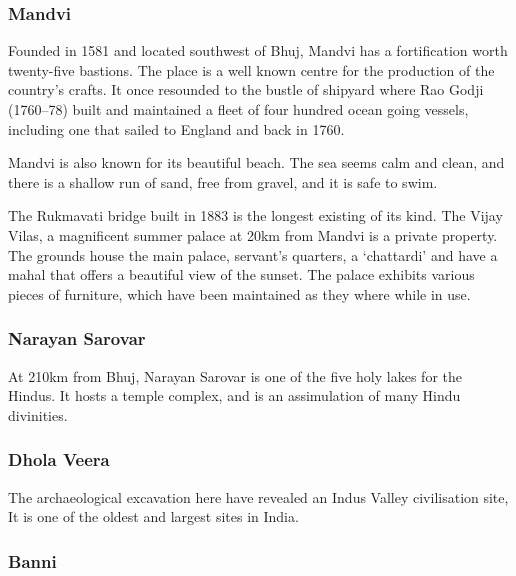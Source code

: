 \subsubsection{Mandvi} %
\label{ssub:mandvi}

Founded in 1581 and located southwest of Bhuj, Mandvi has a fortification worth twenty-five bastions. The place is a well known centre for the production of the country's crafts. It once resounded to the bustle of shipyard where Rao Godji (1760--78) built and maintained a fleet of four hundred ocean going vessels, including one that sailed to England and back in 1760.

Mandvi is also known for its beautiful beach. The sea seems calm and clean, and there is a shallow run of sand, free from gravel, and it is safe to swim.

The Rukmavati bridge built in 1883 is the longest existing of its kind. The Vijay Vilas, a magnificent summer palace at 20km from Mandvi is a private property. The grounds house the main palace, servant's quarters, a `chattardi' and have a mahal that offers a beautiful view of the sunset. The palace exhibits various pieces of furniture, which have been maintained as they where while in use.


\subsubsection{Narayan Sarovar} %
\label{ssub:ns}

At 210km from Bhuj, Narayan Sarovar is one of the five holy lakes for the Hindus. It hosts a temple complex, and is an assimulation of many Hindu divinities.


\subsubsection{Dhola Veera} %
\label{ssub:dv}

The archaeological excavation here have revealed an Indus Valley civilisation site, It is one of the oldest and largest sites in India.


\subsubsection{Banni} %
\label{ssub:banni}

